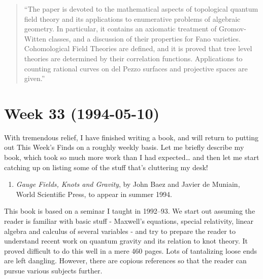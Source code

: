 \documentclass{article}
\def\tightlist{}
\begin{document}
\begin{quote}
``The paper is devoted to the mathematical aspects of topological
quantum field theory and its applications to enumerative problems of
algebraic geometry. In particular, it contains an axiomatic treatment of
Gromov-Witten classes, and a discussion of their properties for Fano
varieties. Cohomological Field Theories are defined, and it is proved
that tree level theories are determined by their correlation functions.
Applications to counting rational curves on del Pezzo surfaces and
projective spaces are given.''
\end{quote}
\hypertarget{week-33-1994-05-10}{%
\section{Week 33 (1994-05-10)}\label{week-33-1994-05-10}}

With tremendous relief, I have finished writing a book, and will return
to putting out This Week's Finds on a roughly weekly basis. Let me
briefly describe my book, which took so much more work than I had
expected\ldots{} and then let me start catching up on listing some of
the stuff that's cluttering my desk!

\begin{enumerate}
\def\labelenumi{\arabic{enumi})}
\tightlist
\item
  \emph{Gauge Fields, Knots and Gravity}, by John Baez and Javier de
  Muniain, World Scientific Press, to appear in summer 1994.
\end{enumerate}

This book is based on a seminar I taught in 1992--93. We start out
assuming the reader is familiar with basic stuff - Maxwell's equations,
special relativity, linear algebra and calculus of several variables -
and try to prepare the reader to understand recent work on quantum
gravity and its relation to knot theory. It proved difficult to do this
well in a mere 460 pages. Lots of tantalizing loose ends are left
dangling. However, there are copious references so that the reader can
pursue various subjects further.
\end{document}
